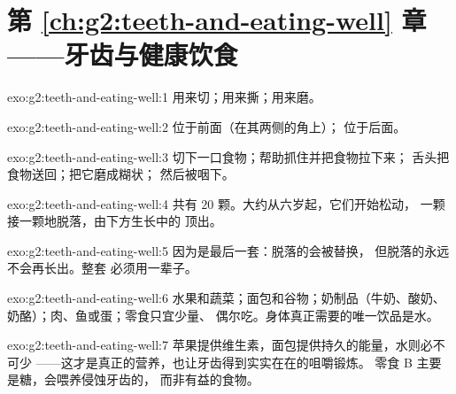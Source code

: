 \section*{第 \ref{ch:g2:teeth-and-eating-well} 章——牙齿与健康饮食}

\begin{solution}{exo:g2:teeth-and-eating-well:1}
用来切；用来撕；用来磨。
\end{solution}

\begin{solution}{exo:g2:teeth-and-eating-well:2}
位于前面（在其两侧的角上）；
位于后面。
\end{solution}

\begin{solution}{exo:g2:teeth-and-eating-well:3}
切下一口食物；帮助抓住并把食物拉下来；
舌头把食物送回；把它磨成糊状；
然后被咽下。
\end{solution}

\begin{solution}{exo:g2:teeth-and-eating-well:4}
共有 $20$ 颗。大约从六岁起，它们开始松动，
一颗接一颗地脱落，由下方生长中的
顶出。
\end{solution}

\begin{solution}{exo:g2:teeth-and-eating-well:5}
因为是最后一套：脱落的会被替换，
但脱落的永远不会再长出。整套
必须用一辈子。
\end{solution}

\begin{solution}{exo:g2:teeth-and-eating-well:6}
水果和蔬菜；面包和谷物；奶制品（牛奶、酸奶、
奶酪）；肉、鱼或蛋；零食只宜少量、
偶尔吃。身体真正需要的唯一饮品是水。
\end{solution}

\begin{solution}{exo:g2:teeth-and-eating-well:7}
苹果提供维生素，面包提供持久的能量，水则必不可少
——这才是真正的营养，也让牙齿得到实实在在的咀嚼锻炼。
零食 B 主要是糖，会喂养侵蚀牙齿的，
而非有益的食物。
\end{solution}

